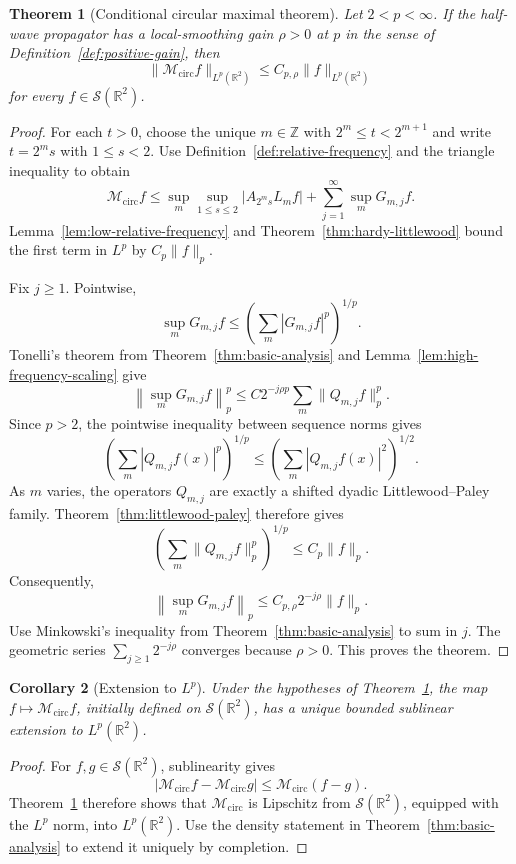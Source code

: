 \documentclass[11pt]{article}
\numberwithin{equation}{section}
\newtheorem{theorem}{Theorem}[section]
\newtheorem{corollary}[theorem]{Corollary}
\theoremstyle{definition}
\theoremstyle{remark}
\newcommand{\R}{\mathbb R}
\newcommand{\Z}{\mathbb Z}
\newcommand{\Sch}{\mathcal S}
\newcommand{\Mcirc}{\mathcal M_{\mathrm{circ}}}
\begin{document}
\begin{theorem}[Conditional circular maximal theorem]\label{thm:conditional-bourgain}
Let $2<p<\infty$.  If the half-wave propagator has a local-smoothing gain $\rho>0$ at $p$ in the sense of Definition~\ref{def:positive-gain}, then
\[
\|\Mcirc f\|_{L^p(\R^2)}\le C_{p,\rho}\|f\|_{L^p(\R^2)}
\]
for every $f\in\Sch(\R^2)$.
\end{theorem}

\begin{proof}
For each $t>0$, choose the unique $m\in\Z$ with $2^m\le t<2^{m+1}$ and write $t=2^ms$ with $1\le s<2$.  Use Definition~\ref{def:relative-frequency} and the triangle inequality to obtain
\[
\Mcirc f
\le \sup_m\sup_{1\le s\le2}|A_{2^ms}L_mf|
+\sum_{j=1}^{\infty}\sup_mG_{m,j}f.
\]
Lemma~\ref{lem:low-relative-frequency} and Theorem~\ref{thm:hardy-littlewood} bound the first term in $L^p$ by $C_p\|f\|_p$.

Fix $j\ge1$.  Pointwise,
\[
\sup_mG_{m,j}f\le\left(\sum_m|G_{m,j}f|^p\right)^{1/p}.
\]
Tonelli's theorem from Theorem~\ref{thm:basic-analysis} and Lemma~\ref{lem:high-frequency-scaling} give
\[
\left\|\sup_mG_{m,j}f\right\|_p^p
\le C2^{-j\rho p}\sum_m\|Q_{m,j}f\|_p^p.
\]
Since $p>2$, the pointwise inequality between sequence norms gives
\[
\left(\sum_m|Q_{m,j}f(x)|^p\right)^{1/p}
\le\left(\sum_m|Q_{m,j}f(x)|^2\right)^{1/2}.
\]
As $m$ varies, the operators $Q_{m,j}$ are exactly a shifted dyadic Littlewood--Paley family.  Theorem~\ref{thm:littlewood-paley} therefore gives
\[
\left(\sum_m\|Q_{m,j}f\|_p^p\right)^{1/p}\le C_p\|f\|_p.
\]
Consequently,
\[
\left\|\sup_mG_{m,j}f\right\|_p\le C_{p,\rho}2^{-j\rho}\|f\|_p.
\]
Use Minkowski's inequality from Theorem~\ref{thm:basic-analysis} to sum in $j$.  The geometric series $\sum_{j\ge1}2^{-j\rho}$ converges because $\rho>0$.  This proves the theorem.
\end{proof}

\begin{corollary}[Extension to $L^p$]\label{cor:conditional-extension}
Under the hypotheses of Theorem~\ref{thm:conditional-bourgain}, the map $f\mapsto\Mcirc f$, initially defined on $\Sch(\R^2)$, has a unique bounded sublinear extension to $L^p(\R^2)$.
\end{corollary}

\begin{proof}
For $f,g\in\Sch(\R^2)$, sublinearity gives
\[
|\Mcirc f-\Mcirc g|\le\Mcirc(f-g).
\]
Theorem~\ref{thm:conditional-bourgain} therefore shows that $\Mcirc$ is Lipschitz from $\Sch(\R^2)$, equipped with the $L^p$ norm, into $L^p(\R^2)$.  Use the density statement in Theorem~\ref{thm:basic-analysis} to extend it uniquely by completion.
\end{proof}
\end{document}
